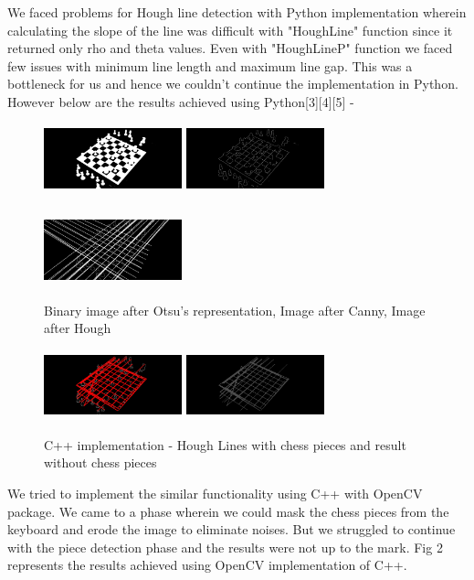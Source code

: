 \documentclass[conference]{IEEEtran}
\begin{document}
We faced problems for Hough line detection with Python implementation wherein calculating the slope of the line was difficult with "HoughLine" function since it returned only rho and theta values. Even with "HoughLineP" function we faced few issues with minimum line length and maximum line gap. This was a bottleneck for us and hence we couldn't continue the implementation in Python. However below are the results achieved using Python[3][4][5] -

\begin{figure}[bhp]
	\includegraphics[width=4cm,height=2cm]{binary.jpg}
    \includegraphics[width=4cm,height=2cm]{canny.jpg}\\ \\
    \includegraphics[width=4cm,height=2cm]{Hough.jpg}
    \caption{Binary image after Otsu's representation, Image after Canny, Image after Hough}
\end{figure}

\begin{figure}[bhp]
	\includegraphics[width=4cm,height=2cm]{HoughLines.jpg}
	\includegraphics[width=4cm,height=2cm]{Result.jpg}\\
	\caption{C++ implementation - Hough Lines with chess pieces and result without chess pieces}
\end{figure}
We tried to implement the similar functionality using C++ with OpenCV package. We came to a phase wherein we could mask the chess pieces from the keyboard and erode the image to eliminate noises. But we struggled to continue with the piece detection phase and the results were not up to the mark. Fig 2 represents the results achieved using OpenCV implementation of C++. 
\end{document}
